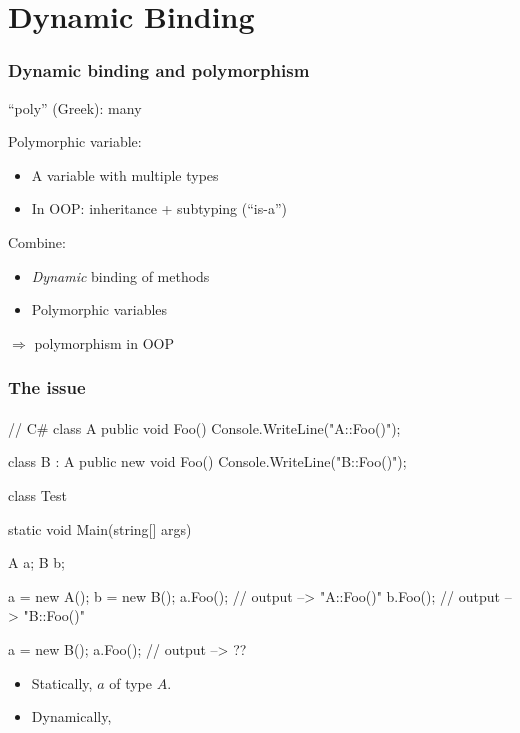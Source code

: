 \documentclass{beamer}
\begin{document}

\section{Dynamic Binding}

\begin{frame}[fragile]

\frametitle{Dynamic binding and polymorphism}
\begin{center}
``poly'' (Greek): many
\end{center}
Polymorphic variable: 
\begin{itemize}
\item A variable with multiple types
\item In OOP: inheritance + subtyping (``is-a'') 
\end{itemize}
Combine:
\begin{itemize}
\item \textit{Dynamic} binding of methods
\item Polymorphic variables
\end{itemize}
$\Longrightarrow$ polymorphism in OOP 

\end{frame}

\begin{frame}[fragile]
\frametitle{The issue}
\framesubtitle{}
%
\begin{cplus3}
        // C# 
        class A {
            public void Foo() { Console.WriteLine("A::Foo()"); }
        }

        class B : A  {
            public new void Foo() { Console.WriteLine("B::Foo()"); }
        }

        class Test {
            static void Main(string[] args)
            {
                A a;
                B b;

                a = new A();
                b = new B();
                a.Foo();  // output --> "A::Foo()"
                b.Foo();  // output --> "B::Foo()"

                a = new B();
                a.Foo();  // output -->  ??
            }
        }
\end{cplus3}
\begin{itemize}
\item Statically, $a$ of type $A$.
\item Dynamically, 
\end{itemize}
\end{frame}
\end{document}
